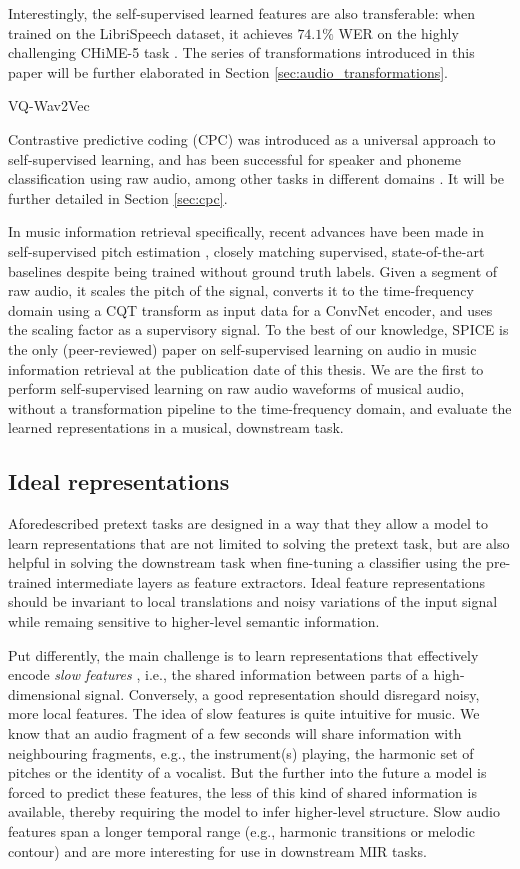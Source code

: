 Interestingly, the self-supervised learned features are also transferable: when trained on the LibriSpeech dataset, it achieves $74.1\%$ WER on the highly challenging CHiME-5 task \cite{barker2018fifth}.
The series of transformations introduced in this paper will be further elaborated in Section \ref{sec:audio_transformations}.

VQ-Wav2Vec

Contrastive predictive coding (CPC) was introduced as a universal approach to self-supervised learning, and has been successful for speaker and phoneme classification using raw audio, among other tasks in different domains \cite{oord_representation_2019}.
It will be further detailed in Section \ref{sec:cpc}.

In music information retrieval specifically, recent advances have been made in self-supervised pitch estimation \cite{spice}, closely matching supervised, state-of-the-art baselines despite being trained without ground truth labels.
Given a segment of raw audio, it scales the pitch of the signal, converts it to the time-frequency domain using a CQT transform as input data for a ConvNet encoder, and uses the scaling factor as a supervisory signal.
To the best of our knowledge, SPICE\cite{spice} is the only (peer-reviewed) paper on self-supervised learning on audio in music information retrieval at the publication date of this thesis. We are the first to perform self-supervised learning on raw audio waveforms of musical audio, without a transformation pipeline to the time-frequency domain, and evaluate the learned representations in a musical, downstream task.

\subsection{Ideal representations}
Aforedescribed pretext tasks are designed in a way that they allow a model to learn representations that are not limited to solving the pretext task, but are also helpful in solving the downstream task when fine-tuning a classifier using the pre-trained intermediate layers as feature extractors.
Ideal feature representations should be invariant to local translations and noisy variations of the input signal while remaing sensitive to higher-level semantic information.

Put differently, the main challenge is to learn representations that effectively encode \textit{slow features} \cite{wiskott_slow_2002}, i.e., the shared information between parts of a high-dimensional signal.
Conversely, a good representation should disregard noisy, more local features.
The idea of slow features is quite intuitive for music.
We know that an audio fragment of a few seconds will share information with neighbouring fragments, e.g., the instrument(s) playing, the harmonic set of pitches or the identity of a vocalist.
 But the further into the future a model is forced to predict these features, the less of this kind of shared information is available, thereby requiring the model to infer higher-level structure.
Slow audio features span a longer temporal range (e.g., harmonic transitions or melodic contour) and are more interesting for use in downstream MIR tasks.


